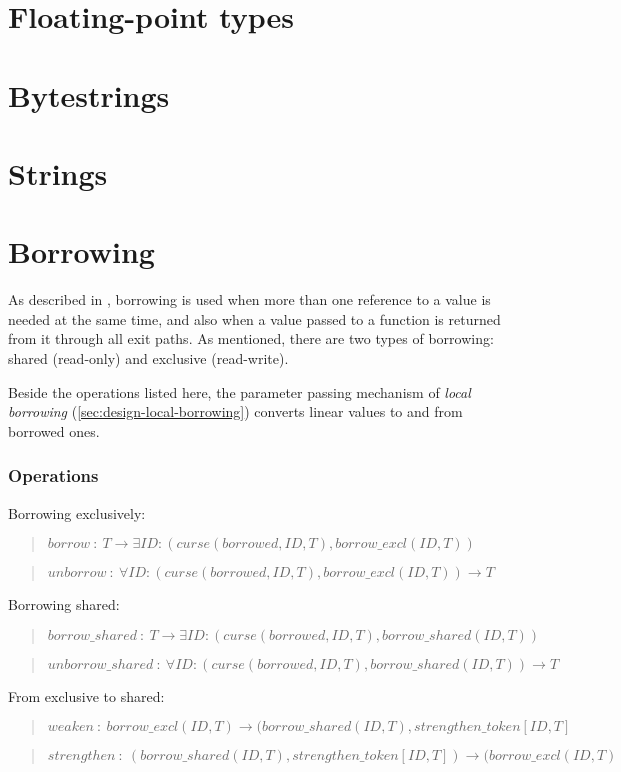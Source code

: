 \documentclass[a4paper]{book}
\newcommand\FuncSignature[2]{\begin{quote}$\mathit{#1}\ :\ \mathit{#2}$\end{quote}}
\begin{document}
\chapter{Floating-point types}
\chapter{Bytestrings}





\chapter{Strings}
\chapter{Borrowing}
As described in , borrowing is used when
more than one reference to a value is needed at the same time, and also
when a value passed to a function is returned from it through all exit paths.
As mentioned, there are two types of borrowing: shared (read-only) and
exclusive (read-write).

Beside the operations listed here, the parameter passing mechanism of
\emph{local borrowing} (\ref{sec:design-local-borrowing})
converts linear values to and from borrowed ones.

\subsection*{Operations}
Borrowing exclusively:

\FuncSignature{borrow}{T \to \exists ID: (curse(borrowed, ID, T), borrow\_excl(ID, T))}
\FuncSignature{unborrow}{\forall ID: (curse(borrowed, ID, T), borrow\_excl(ID, T)) \to T}

\noindent
Borrowing shared:

\FuncSignature{borrow\_shared}{T \to \exists ID: (curse(borrowed, ID, T), borrow\_shared(ID, T))}
\FuncSignature{unborrow\_shared}{\forall ID: (curse(borrowed, ID, T), borrow\_shared(ID, T)) \to T}

\noindent
From exclusive to shared:

\FuncSignature{weaken}{borrow\_excl(ID, T) \to (borrow\_shared(ID, T), strengthen\_token[ID,T]}
\FuncSignature{strengthen}{(borrow\_shared(ID, T), strengthen\_token[ID,T]) \to (borrow\_excl(ID, T)}
\end{document}
